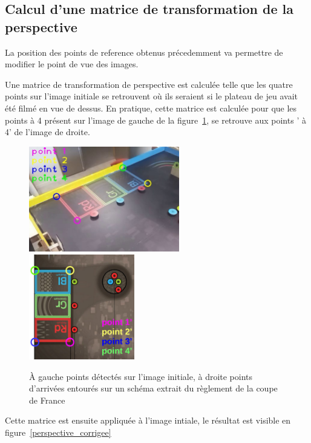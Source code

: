 \documentclass{article}
\begin{document}
\subsection{Calcul d'une matrice de transformation de la perspective}
La position des points de reference obtenus précedemment va permettre de modifier le point de vue des images.

Une matrice de transformation de perspective est calculée telle que les quatre points sur l'image initiale se retrouvent
où ils seraient si le plateau de jeu avait été filmé en vue de dessus. En pratique, cette matrice est calculée pour que les points  à 4
présent sur l'image de gauche de la figure~\ref{modif_perspective}, se retrouve aux points ' à 4' de l'image de droite.

\begin{figure}[!h]
\begin{center}
\includegraphics[height=130pt]{image_4_points.jpg}
\includegraphics[height=130pt]{modif_perspective.jpg}
\end{center}
\caption{À gauche points détectés sur l'image initiale, à droite points d'arrivées entourés sur un schéma extrait du règlement de la coupe de France}
\label{modif_perspective}
\end{figure}

Cette matrice est ensuite appliquée à l'image intiale, le résultat est visible en figure~\ref{perspective_corrigee}
\end{document}
